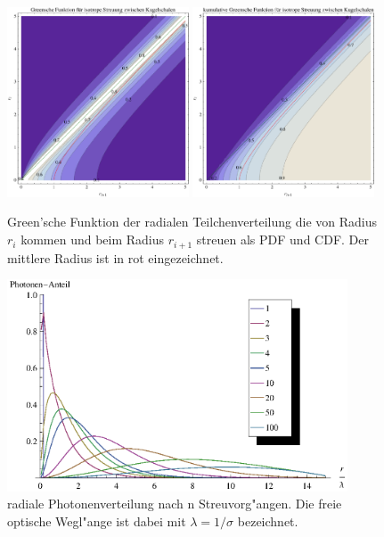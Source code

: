 	\begin{figure}
		\centering
		\includegraphics[width=0.48\textwidth]{radial_greens_function_pdf.eps}
		\includegraphics[width=0.48\textwidth]{radial_greens_function_cdf.eps}
		\caption{Green'sche Funktion der radialen Teilchenverteilung die von Radius $r_i$ kommen und beim Radius $r_{i+1}$ streuen als PDF und CDF. Der mittlere Radius ist in rot eingezeichnet.}
		\label{fig:radial_greens_function_pdfcdf}
	\end{figure}
	\begin{figure}
		\centering
		\includegraphics[width=0.9\textwidth]{gnlist_plot.eps}
		\caption{radiale Photonenverteilung nach n Streuvorg"angen. Die freie optische Wegl"ange ist dabei mit $\lambda=1/\sigma$ bezeichnet.}
		\label{fig:gnlist}
	\end{figure}
